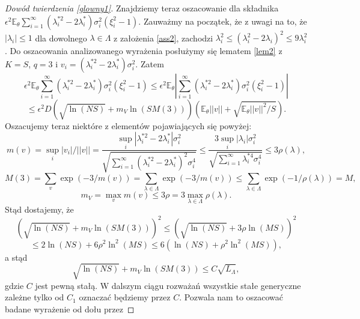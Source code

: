 \documentclass[man,mfiu]{mgrwms}
\begin{document}
\begin{proof}[Dowód twierdzenia \ref{glowny1}]
Znajdziemy teraz oszacowanie dla składnika $\epsilon^2\mathbb{E}_{\theta}\sum_{i=1}^{\infty}(\lambda_i^{*2}-2\lambda_i^*)\sigma_i^2(\xi_i^2-1)$. Zauważmy na początek, że z uwagi na to, że $|\lambda_i|\leq 1$ dla dowolnego $\lambda\in \Lambda$ z założenia \ref{ass2}, zachodzi $\lambda_i^2\leq (\lambda_i^2-2\lambda_i)^2\leq 9\lambda_i^2$. Do oszacowania analizowanego wyrażenia posłużymy się lematem \ref{lem2} z $K=S$, $q=3$ i $v_i=(\lambda_i^{*2}-2\lambda_i^*)\sigma_i^2$. Zatem
\begin{displaymath}
\epsilon^2\mathbb{E}_{\theta}\sum_{i=1}^{\infty}(\lambda_i^{*2}-2\lambda_i^*)\sigma_i^2(\xi_i^2-1)\leq \epsilon^2\mathbb{E}_{\theta}\left|\sum_{i=1}^{\infty}(\lambda_i^{*2}-2\lambda_i^*)\sigma_i^2(\xi_i^2-1)\right|
\end{displaymath}
\begin{displaymath}
\leq \epsilon^2D\left(\sqrt{\ln (NS)}+m_V\ln (SM(3))\right)\left(\mathbb{E}_{\theta}||v||+\sqrt{\mathbb{E}_{\theta}||v||^2/S}\right).
\end{displaymath}
Oszacujemy teraz niektóre z elementów pojawiających się powyżej:
\begin{displaymath}
m(v)=\sup_i|v_i|/||v||=\frac{\sup_i|\lambda_i^{*2}-2\lambda_i^*|\sigma_i^2}{\sqrt{\sum_{i=1}^{\infty}(\lambda_i^{*2}-2\lambda_i^*)^2\sigma_i^4}}\leq \frac{3\sup_i|\lambda_i|\sigma_i^2}{\sqrt{\sum_{i=1}^{\infty}\lambda_i^{*4}\sigma_i^4}}\leq 3\rho (\lambda),
\end{displaymath}
\begin{displaymath}
M(3)=\sum_{v}\exp (-3/m(v))=\sum_{\lambda\in \Lambda}\exp (-3/m(v))\leq \sum_{\lambda\in \Lambda}\exp (-1/\rho(\lambda))=M,
\end{displaymath}
\begin{displaymath}
m_V=\max_{v}m(v)\leq 3\rho=3\max_{\lambda\in \Lambda}\rho(\lambda).
\end{displaymath}
Stąd dostajemy, że 
\begin{displaymath}
\left(\sqrt{\ln (NS)}+m_V\ln (SM(3))\right)^2\leq \left(\sqrt{\ln (NS)}+3\rho\ln (MS)\right)^2 
\end{displaymath}
\begin{displaymath}
\leq 2\ln (NS)+6\rho^2\ln^2 (MS)\leq 6(\ln (NS)+\rho^2\ln^2 (MS)),
\end{displaymath}
a stąd
\begin{displaymath}
\sqrt{\ln (NS)}+m_V\ln (SM(3))\leq C\sqrt{L_{\Lambda}},
\end{displaymath}
gdzie $C$ jest pewną stałą. W dalszym ciągu rozważań wszystkie stałe generyczne zależne tylko od $C_1$ oznaczać będziemy przez $C$. Pozwala nam to oszacować badane wyrażenie od dołu przez

\end{proof}
\end{document}
